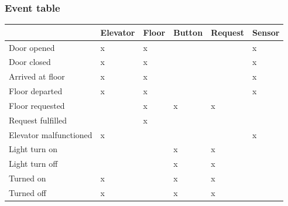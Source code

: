 \subsubsection{Event table}

\begin{table}[h]
\centering
\begin{tabular}{|l|l|l|l|l|l|}
\hline
 & Elevator & Floor & Button & Request & Sensor \\ \hline
Door opened & x & x &  &  & x \\ \hline
Door closed & x & x &  &  & x \\ \hline
Arrived at floor & x & x &  &  & x \\ \hline
Floor departed & x & x &  &  & x \\ \hline
Floor requested &  & x & x & x &  \\ \hline
Request fulfilled &  & x &  &  & \\ \hline
Elevator malfunctioned & x &  &  &  & x \\ \hline
Light turn on &  &  & x & x &  \\ \hline
Light turn off &  &  & x & x &  \\ \hline
Turned on & x &  & x & x &  \\ \hline
Turned off & x &  & x & x &  \\ \hline
\end{tabular}
\end{table}